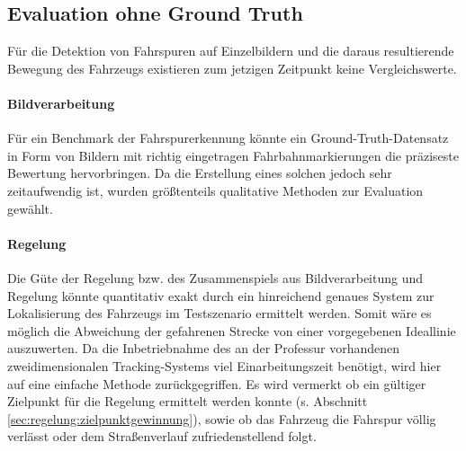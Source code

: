 \subsection{Evaluation ohne Ground Truth}
\label{ssec:evaluation:messungen:ohnegt}
Für die Detektion von Fahrspuren auf Einzelbildern und die daraus resultierende Bewegung des Fahrzeugs existieren zum jetzigen Zeitpunkt keine Vergleichswerte. 

\paragraph{Bildverarbeitung} 
Für ein Benchmark der Fahrspurerkennung könnte ein Ground-Truth-Datensatz in Form von Bildern mit richtig eingetragen Fahrbahnmarkierungen die präziseste Bewertung hervorbringen. Da die Erstellung eines solchen jedoch sehr zeitaufwendig ist, wurden größtenteils qualitative Methoden zur Evaluation gewählt.



\paragraph{Regelung} 
Die Güte der Regelung bzw. des Zusammenspiels aus Bildverarbeitung und Regelung könnte quantitativ exakt durch ein hinreichend genaues System zur Lokalisierung des Fahrzeugs im Testszenario ermittelt werden. Somit wäre es möglich die Abweichung der gefahrenen Strecke von einer vorgegebenen Ideallinie auszuwerten. Da die Inbetriebnahme des an der Professur vorhandenen zweidimensionalen Tracking-Systems viel Einarbeitungszeit benötigt, wird hier auf eine einfache Methode zurückgegriffen. Es wird vermerkt ob ein gültiger Zielpunkt für die Regelung ermittelt werden konnte (s. Abschnitt \ref{sec:regelung:zielpunktgewinnung}), sowie ob das Fahrzeug die Fahrspur völlig verlässt oder dem Straßenverlauf zufriedenstellend folgt.

